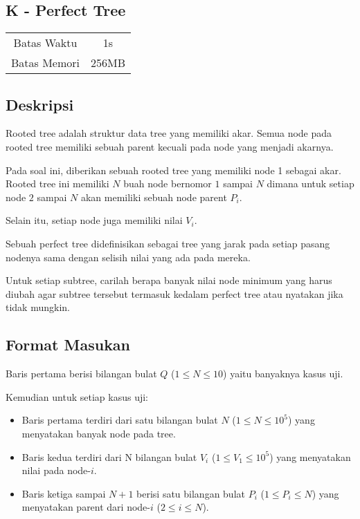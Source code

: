 \documentclass{article}
\begin{document}
\begin{center}
    \section*{K - Perfect Tree} %

    \begin{tabular}{ | c c | }
        \hline
        Batas Waktu  & 1s \\    %
        Batas Memori & 256MB \\  %
        \hline
    \end{tabular}
\end{center}

\subsection*{Deskripsi}

Rooted tree adalah struktur data tree yang memiliki akar. Semua node pada rooted tree memiliki sebuah parent kecuali pada node yang menjadi akarnya.

Pada soal ini, diberikan sebuah rooted tree yang memiliki node 1 sebagai akar. Rooted tree ini memiliki $N$ buah node bernomor $1$ sampai $N$ dimana untuk setiap node $2$ sampai $N$ akan memiliki sebuah node parent $P_i$. 

Selain itu, setiap node juga memiliki nilai $V_i$.

Sebuah perfect tree didefinisikan sebagai tree yang jarak pada setiap pasang nodenya sama dengan selisih nilai yang ada pada mereka.

Untuk setiap subtree, carilah berapa banyak nilai node minimum yang harus diubah agar subtree tersebut termasuk kedalam perfect tree atau nyatakan jika tidak mungkin.


\subsection*{Format Masukan}

Baris pertama berisi bilangan bulat $Q$ ($1 \leq N \leq 10$) yaitu banyaknya kasus uji.

Kemudian untuk setiap kasus uji:

\begin{itemize}
    \item Baris pertama terdiri dari satu bilangan bulat $N$ ($1 \leq N \leq 10^5$) yang menyatakan banyak node pada tree.
    \item Baris kedua terdiri dari N bilangan bulat $V_i$ ($1 \leq V_1 \leq 10^5$) yang menyatakan nilai pada node-$i$.
    \item Baris ketiga sampai $N + 1$ berisi satu bilangan bulat $P_i$ ($1 \leq P_i \leq N$) yang menyatakan parent dari node-$i$ ($2 \leq i \leq N$).
\end{itemize}
\end{document}
